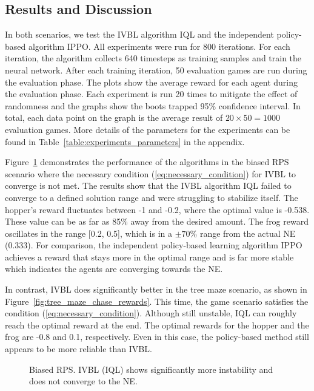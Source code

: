 \documentclass[]{interact}
\theoremstyle{plain}%
\theoremstyle{definition}
\theoremstyle{remark}
\begin{document}
\subsection{Results and Discussion}
In both scenarios, we test the IVBL algorithm IQL and the independent policy-based algorithm IPPO. All experiments were run for 800 iterations. For each iteration, the algorithm collects 640 timesteps as training samples and train the neural network. After each training iteration, 50 evaluation games are run during the evaluation phase. The plots show the average reward for each agent during the evaluation phase. Each experiment is run 20 times to mitigate the effect of randomness and the graphs show the boots trapped 95\% confidence interval. In total, each data point on the graph is the average result of $20 \times 50 = 1000$ evaluation games. More details of the parameters for the experiments can be found in Table~\ref{table:experiments_parameters} in the appendix.

Figure~\ref{fig:biased_rps_in_food_chain_rewards} demonstrates the performance of the algorithms in the biased RPS scenario where the necessary condition (\ref{eq:necessary_condition}) for IVBL to converge is not met. The results show that the IVBL algorithm IQL failed to converge to a defined solution range and were struggling to stabilize itself. The hopper's reward fluctuates between -1 and -0.2, where the optimal value is -0.538. These value can be as far as 85\% away from the desired amount. The frog reward oscillates in the range [0.2, 0.5], which is in a $\pm 70\%$  range from the actual NE (0.333). For comparison, the independent policy-based learning algorithm IPPO achieves a reward that stays more in the optimal range and is far more stable which indicates the agents are converging towards the NE.

In contrast, IVBL does significantly better in the tree maze scenario, as shown in Figure~\ref{fig:tree_maze_chase_rewards}. This time, the game scenario satisfies the condition (\ref{eq:necessary_condition}). Although still unstable, IQL can roughly reach the optimal reward at the end. The optimal rewards for the hopper and the frog are -0.8 and 0.1, respectively. Even in this case, the policy-based method still appears to be more reliable than IVBL.

\begin{figure}
\centering
{}
\caption{Biased RPS. IVBL (IQL) shows significantly more instability and does not converge to the NE.}
\label{fig:biased_rps_in_food_chain_rewards}
\end{figure}
\end{document}
